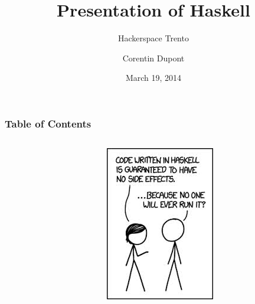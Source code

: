 \documentclass{beamer}
\begin{document}

\title{Presentation of Haskell}
\subtitle{Hackerspace Trento}
\author{Corentin Dupont}

\date{March 19, 2014}

\maketitle

\begin{frame}
  \frametitle{Table of Contents}
  \begin{columns}[]
  \begin{column}[]{5cm}
   \tableofcontents[]
  \end{column}
  \begin{column}[]{5cm}
    \includegraphics[width=1\linewidth]{figs/xkcd}
  \end{column}
 \end{columns}
 
  
\end{frame}
\end{document}
